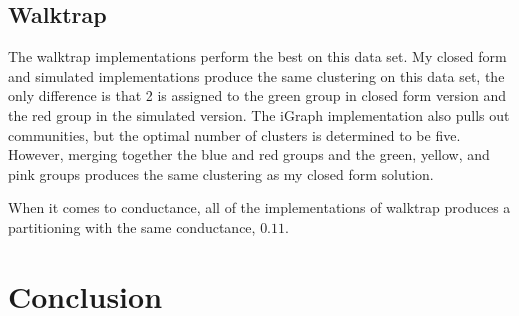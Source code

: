 \documentclass{article}
\begin{document}
    \subsection{Walktrap}
    The walktrap implementations perform the best on this data set. My closed form and simulated implementations produce the same clustering on this data set, the only difference is that 2 is assigned to the green group in closed form version and the red group in the simulated version. The iGraph implementation also pulls out communities, but the optimal number of clusters is determined to be five. However, merging together the blue and red groups and the green, yellow, and pink groups produces the same clustering as my closed form solution.
    \par
    When it comes to conductance, all of the implementations of walktrap produces a partitioning with the same conductance, $0.11$.


\section{Conclusion}


\newpage



\newpage
\end{document}
